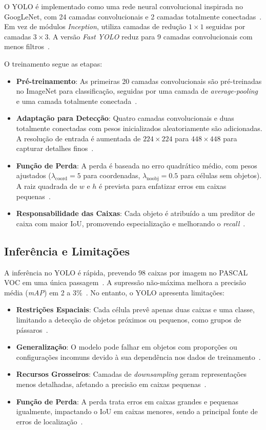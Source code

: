\documentclass[journal,transmag]{IEEEtran}
\begin{document}
O YOLO é implementado como uma rede neural convolucional inspirada no GoogLeNet, com 24 camadas convolucionais e 2 camadas totalmente conectadas~\cite{Redmon2015}. Em vez de módulos \textit{Inception}, utiliza camadas de redução \( 1 \times 1 \) seguidas por camadas \( 3 \times 3 \). A versão \textit{Fast YOLO} reduz para 9 camadas convolucionais com menos filtros~\cite{Redmon2015}.

O treinamento segue as etapas:

\begin{itemize}
	\item \textbf{Pré-treinamento}: As primeiras 20 camadas convolucionais são pré-treinadas no ImageNet para classificação, seguidas por uma camada de \textit{average-pooling} e uma camada totalmente conectada~\cite{Redmon2015}.
	\item \textbf{Adaptação para Detecção}: Quatro camadas convolucionais e duas totalmente conectadas com pesos inicializados aleatoriamente são adicionadas. A resolução de entrada é aumentada de \( 224 \times 224 \) para \( 448 \times 448 \) para capturar detalhes finos~\cite{Redmon2015}.
	\item \textbf{Função de Perda}: A perda é baseada no erro quadrático médio, com pesos ajustados (\( \lambda_{\text{coord}} = 5 \) para coordenadas, \( \lambda_{\text{noobj}} = 0.5 \) para células sem objetos). A raiz quadrada de \( w \) e \( h \) é prevista para enfatizar erros em caixas pequenas~\cite{Redmon2015}.
	\item \textbf{Responsabilidade das Caixas}: Cada objeto é atribuído a um preditor de caixa com maior IoU, promovendo especialização e melhorando o \textit{recall}~\cite{Redmon2015}.
\end{itemize}

\subsection{Inferência e Limitações}

A inferência no YOLO é rápida, prevendo 98 caixas por imagem no PASCAL VOC em uma única passagem~\cite{Redmon2015}. A supressão não-máxima melhora a precisão média (\textit{mAP}) em 2 a 3\%~\cite{Redmon2015}. No entanto, o YOLO apresenta limitações:

\begin{itemize}
	\item \textbf{Restrições Espaciais}: Cada célula prevê apenas duas caixas e uma classe, limitando a detecção de objetos próximos ou pequenos, como grupos de pássaros~\cite{Redmon2015}.
	\item \textbf{Generalização}: O modelo pode falhar em objetos com proporções ou configurações incomuns devido à sua dependência nos dados de treinamento~\cite{Redmon2015}.
	\item \textbf{Recursos Grosseiros}: Camadas de \textit{downsampling} geram representações menos detalhadas, afetando a precisão em caixas pequenas~\cite{Redmon2015}.
	\item \textbf{Função de Perda}: A perda trata erros em caixas grandes e pequenas igualmente, impactando o IoU em caixas menores, sendo a principal fonte de erros de localização~\cite{Redmon2015}.
\end{itemize}
\end{document}
